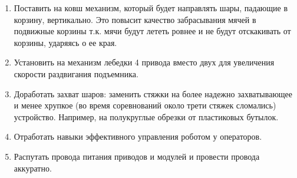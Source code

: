 \begin{enumerate}
\begin{enumerate}
  	\item Поставить на ковш механизм, который будет направлять шары, падающие в корзину, вертикально. Это повысит качество забрасывания мячей в подвижные корзины т.к. мячи будут лететь ровнее и не будут отскакивать от корзины, ударяясь о ее края.
  	
  	\item Установить на механизм лебедки 4 привода вместо двух для увеличения скорости раздвигания подъемника.
  	
  	\item Доработать захват шаров: заменить стяжки на более надежно захватывающее и менее хрупкое (во время соревнований около трети стяжек сломались) устройство. Например, на полукруглые обрезки от пластиковых бутылок.
  	
  	\item Отработать навыки эффективного управления роботом у операторов.
  	
  	\item Распутать провода питания приводов и модулей и провести провода аккуратно.
  	
  \end{enumerate}
  
\end{enumerate}
\fillpage
